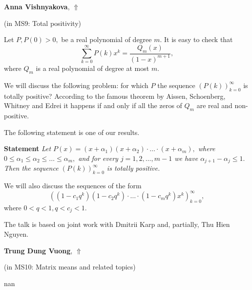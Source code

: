 \documentclass[ILAS2025-program.tex]{subfiles}
\begin{document}
\hypertarget{down0045}{}\begin{ilasabstract}
    
\textbf{Anna Vishnyakova},  \hfill \hyperlink{up0045}{$\Uparrow$}
    
    
(in {\color{mstitle}MS9: Total positivity})
        
\mtskip
    Let $P, P(0) >0,$ be a real polynomial of degree $m.$ It is easy to check that
$$ \sum_{k=0}^\infty P(k) x^k =\frac{Q_m(x)}{(1-x)^{m+1}},  $$
where $Q_m$ is a real polynomial of degree at most $m.$

We will discuss the following problem: for which $P$ the sequence 
$(P(k))_{k=0}^\infty$ is totally positive? According to the famous 
theorem by Aissen, Schoenberg, Whitney and Edrei it happens if and
only if all the zeros of $Q_m$ are real and non-positive.

The following statement is one of our results.

{\bf Statement}  {\it Let $P(x) =(x+\alpha_1)(x+\alpha_2)\cdot \ldots \cdot (x+\alpha_m),$  where $0\leq \alpha_1 \leq \alpha_2 \leq \ldots \leq \alpha_m,$ and for every $j=1, 2, \ldots, m-1$ we have $ \alpha_{j+1} - \alpha_j \leq 1.$  Then the sequence $(P(k))_{k=0}^\infty$ is totally positive. }

We will also discuss the sequences of the form 
$$\left((1-c_1 q^k)(1-c_2 q^k)\cdot \ldots \cdot (1-c_m q^k) x^k\right)_{k=0}^\infty, $$ 
where  $0< q < 1,  q< c_j < 1.$

The talk is based on joint work with Dmitrii Karp and, partially, Thu Hien Nguyen.




\end{ilasabstract}
    

\hypertarget{down0134}{}\begin{ilasabstract}
    
\textbf{Trung Dung Vuong},  \hfill \hyperlink{up0134}{$\Uparrow$}
    
    
(in {\color{mstitle}MS10: Matrix means and related topics})
        
\mtskip
    nan
\end{ilasabstract}
    
\end{document}
